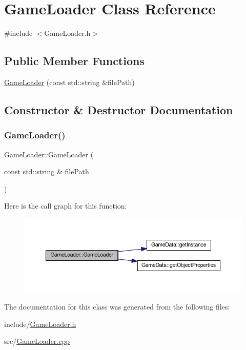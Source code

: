 \hypertarget{class_game_loader}{}\section{Game\+Loader Class Reference}
\label{class_game_loader}


{\ttfamily \#include $<$Game\+Loader.\+h$>$}

\subsection*{Public Member Functions}
\begin{DoxyCompactItemize}
\item 
\hyperlink{class_game_loader_ac47fc3a0b84e55b5a141047a3baee19e}{Game\+Loader} (const std\+::string \&file\+Path)
\end{DoxyCompactItemize}


\subsection{Constructor \& Destructor Documentation}
\mbox{\label{class_game_loader_ac47fc3a0b84e55b5a141047a3baee19e}} 
\subsubsection{\texorpdfstring{Game\+Loader()}{GameLoader()}}
{\footnotesize\ttfamily Game\+Loader\+::\+Game\+Loader (\begin{DoxyParamCaption}\item[{const std\+::string \&}]{file\+Path }\end{DoxyParamCaption})}

Here is the call graph for this function\+:
\nopagebreak
\begin{figure}[H]
\begin{center}
\leavevmode
\includegraphics[width=350pt]{class_game_loader_ac47fc3a0b84e55b5a141047a3baee19e_cgraph}
\end{center}
\end{figure}


The documentation for this class was generated from the following files\+:\begin{DoxyCompactItemize}
\item 
include/\hyperlink{_game_loader_8h}{Game\+Loader.\+h}\item 
src/\hyperlink{_game_loader_8cpp}{Game\+Loader.\+cpp}\end{DoxyCompactItemize}
